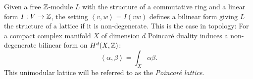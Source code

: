 \begin{example}
Given a free $\mathbb{Z}$-module $L$ with the structure of a commutative ring and a linear form $I:V\rightarrow \mathbb{Z}$, the setting $\left<v,w\right>=I(vw)$ defines a bilinear form giving $L$ the structure of a lattice if it is non-degenerate. This is the case in topology:
For a compact complex manifold $X$ of dimension $d$ Poincar\'e duality induces a non-degenerate bilinear form on $H^d(X,\mathbb{Z})$: 
$$
\left<\alpha,\beta\right> = \int_X\alpha\beta.
$$ 
This unimodular lattice will be referred to as the \emph{Poincar\'e lattice}.
\end{example}